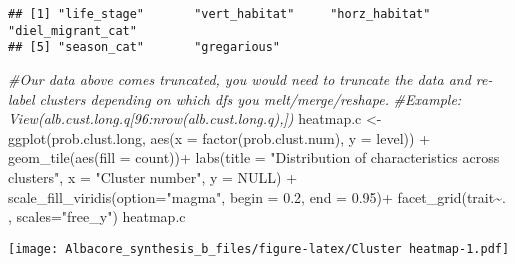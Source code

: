 \documentclass[
]{article}
\newenvironment{Shaded}{\begin{snugshade}}{\end{snugshade}}
\newcommand{\AttributeTok}[1]{\textcolor[rgb]{0.77,0.63,0.00}{#1}}
\newcommand{\CommentTok}[1]{\textcolor[rgb]{0.56,0.35,0.01}{\textit{#1}}}
\newcommand{\ConstantTok}[1]{\textcolor[rgb]{0.00,0.00,0.00}{#1}}
\newcommand{\FloatTok}[1]{\textcolor[rgb]{0.00,0.00,0.81}{#1}}
\newcommand{\FunctionTok}[1]{\textcolor[rgb]{0.00,0.00,0.00}{#1}}
\newcommand{\NormalTok}[1]{#1}
\newcommand{\OtherTok}[1]{\textcolor[rgb]{0.56,0.35,0.01}{#1}}
\newcommand{\SpecialCharTok}[1]{\textcolor[rgb]{0.00,0.00,0.00}{#1}}
\newcommand{\StringTok}[1]{\textcolor[rgb]{0.31,0.60,0.02}{#1}}
\begin{document}
\begin{verbatim}
## [1] "life_stage"       "vert_habitat"     "horz_habitat"     "diel_migrant_cat"
## [5] "season_cat"       "gregarious"
\end{verbatim}

\begin{Shaded}
\begin{Highlighting}[]
\CommentTok{\#Our data above comes truncated, you would need to truncate the data and re{-}label clusters depending on which dfs you melt/merge/reshape.}
\CommentTok{\#Example: View(alb.cust.long.q[96:nrow(alb.cust.long.q),])}
\NormalTok{heatmap.c }\OtherTok{\textless{}{-}} \FunctionTok{ggplot}\NormalTok{(prob.clust.long, }\FunctionTok{aes}\NormalTok{(}\AttributeTok{x =} \FunctionTok{factor}\NormalTok{(prob.clust.num), }\AttributeTok{y =}\NormalTok{ level)) }\SpecialCharTok{+}
  \FunctionTok{geom\_tile}\NormalTok{(}\FunctionTok{aes}\NormalTok{(}\AttributeTok{fill =}\NormalTok{ count))}\SpecialCharTok{+}
  \FunctionTok{labs}\NormalTok{(}\AttributeTok{title =} \StringTok{"Distribution of characteristics across clusters"}\NormalTok{, }\AttributeTok{x =} \StringTok{"Cluster number"}\NormalTok{, }\AttributeTok{y =} \ConstantTok{NULL}\NormalTok{) }\SpecialCharTok{+}
  \FunctionTok{scale\_fill\_viridis}\NormalTok{(}\AttributeTok{option=}\StringTok{"magma"}\NormalTok{, }\AttributeTok{begin =} \FloatTok{0.2}\NormalTok{, }\AttributeTok{end =} \FloatTok{0.95}\NormalTok{)}\SpecialCharTok{+}
  \FunctionTok{facet\_grid}\NormalTok{(trait}\SpecialCharTok{\textasciitilde{}}\NormalTok{. , }\AttributeTok{scales=}\StringTok{"free\_y"}\NormalTok{)}
\NormalTok{heatmap.c}
\end{Highlighting}
\end{Shaded}

\texttt{[image: Albacore\_synthesis\_b\_files/figure-latex/Cluster heatmap-1.pdf]}
\end{document}
